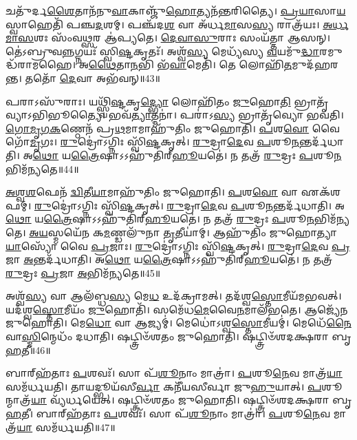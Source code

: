 𑌚𑌤𑍁᳴𑌰𑍍𑌦\-\ul{𑌶𑍈}\-𑌤𑌾𑌨᳴𑌨𑍁\-\ul{𑌵𑌾}\-𑌕𑌾𑌞𑍍𑌜𑍁᳴\-\ul{𑌹𑍋}\-𑌤𑍍𑌯𑌨᳴𑌨𑍍𑌤𑌰𑌿𑌤𑍍𑌯𑍈।
\-\ul{𑌪𑍍𑌰}\-\-\ul{𑌯𑌾}\-𑌸𑌾\-\ul{𑌯} 𑌸𑍍𑌵𑌾𑌹𑍇𑌤𑌿᳴ 𑌪𑌞𑍍𑌚\-\ul{𑌦}\-𑌶𑌮𑍍।
𑌪𑌞𑍍𑌚᳴𑌦\-\ul{𑌶} 𑌵𑌾 𑌅᳴𑌰𑍍𑌧\-\ul{𑌮𑌾}\-𑌸\-\ul{𑌸𑍍𑌯} 𑌰𑌾𑌤𑍍𑌰᳴𑌯𑌃।
\-\ul{𑌅}\-\-\ul{𑌰𑍍𑌧}\-\-\ul{𑌮𑌾}\-\-\ul{𑌸}\-𑌶𑌃 𑌸𑌂᳴𑌵\-\ul{𑌥𑍍𑌸}\-𑌰 𑌆॑𑌪𑍍𑌯𑌤𑍇।
\-\ul{𑌦𑍇}\-\-\ul{𑌵𑌾}\-\-\ul{𑌸𑍁}\-𑌰𑌾𑌃 𑌸𑌂𑌯᳴𑌤𑍍𑌤𑌾 𑌆𑌸𑌨𑍍।
𑌤𑍇॑𑌽𑌬𑍍𑌰𑍁𑌵\-\ul{𑌨𑍍𑌨}\-𑌗𑍍𑌨𑌯𑌃᳴ 𑌸𑍍𑌵𑌿\-\ul{𑌷𑍍𑌟}\-𑌕𑍃𑌤𑌃᳴।
𑌅𑌶𑍍𑌵᳴\-\ul{𑌸𑍍𑌯} 𑌮𑍇𑌧𑍍𑌯᳴𑌸𑍍𑌯 \ul{𑌵}\-𑌯𑌮𑍁᳴\-\ul{𑌦𑍍𑌧𑌾}\-𑌰𑌮𑍁𑌦𑍍𑌧᳴𑌰𑌾𑌮𑌹𑍈।
𑌅\-\ul{𑌥𑍈}\-𑌤𑌾\-\ul{𑌨}\-𑌭𑌿 𑌭᳴\-\ul{𑌵𑌾}\-𑌮𑍇𑌤𑌿᳴।
𑌤𑍇 𑌲𑍋𑌹𑌿᳴\-\ul{𑌤}\-𑌮𑍁𑌦᳴𑌹𑌰𑌨𑍍𑌤।
𑌤𑌤𑍋᳴ \ul{𑌦𑍇}\-𑌵𑌾 𑌅𑌭᳴𑌵𑌨𑍍॥43॥

𑌪𑌰𑌾𑌽𑌸𑍁᳴𑌰𑌾𑌃।
𑌯𑌥𑍍𑌸𑍍𑌵𑌿᳴\-\ul{𑌷𑍍𑌟}\-𑌕𑍃\-\ul{𑌦𑍍𑌭𑍍𑌯𑍋} 𑌲𑍋𑌹𑌿᳴𑌤𑌂 \ul{𑌜𑍁}\-𑌹𑍋\-\ul{𑌤𑌿} 𑌭𑍍𑌰𑌾𑌤𑍃᳴𑌵𑍍𑌯𑌾𑌽𑌭𑌿𑌭𑍂𑌤𑍍𑌯𑍈।
𑌭𑌵᳴\-\ul{𑌤𑍍𑌯𑌾}\-𑌤𑍍𑌮𑌨𑌾॑।
𑌪𑌰𑌾॑𑌽\-\ul{𑌸𑍍𑌯} 𑌭𑍍𑌰𑌾𑌤𑍃᳴𑌵𑍍𑌯𑍋 𑌭𑌵𑌤𑌿।
\-\ul{𑌗𑍋}\-\-\ul{𑌮𑍃}\-\-\ul{𑌗}\-\-\ul{𑌕}\-𑌣𑍍𑌠𑍇𑌨᳴ 𑌪𑍍𑌰\-\ul{𑌥}\-𑌮𑌾𑌮𑌾𑌹𑍁᳴𑌤𑌿𑌂 𑌜𑍁𑌹𑍋𑌤𑌿।
\-\ul{𑌪}\-𑌶\-\ul{𑌵𑍋} 𑌵𑍈 𑌗𑍋᳴\-\ul{𑌮𑍃}\-𑌗𑌃।
\-\ul{𑌰𑍁}\-𑌦𑍍𑌰𑍋॑\-𑌽𑌗𑍍𑌨𑌿𑌃 𑌸𑍍𑌵𑌿᳴\-\ul{𑌷𑍍𑌟}\-𑌕𑍃𑌤𑍍।
\-\ul{𑌰𑍁}\-𑌦𑍍𑌰𑌾\-\ul{𑌦𑍇}\-𑌵 \ul{𑌪}\-𑌶𑍂\-\ul{𑌨}\-𑌨𑍍𑌤𑌰𑍍𑌦᳴𑌧𑌾𑌤𑌿।
𑌅\-\ul{𑌥𑍋} 𑌯\-\ul{𑌤𑍍𑌰𑍈}\-𑌷𑌾\-𑌽𑌽𑌹𑍁᳴𑌤𑌿𑌰𑍍‌\mbox{}\-\ul{𑌹𑍂}\-𑌯𑌤𑍇॑।
𑌨 𑌤𑌤𑍍𑌰᳴ \ul{𑌰𑍁}\-𑌦𑍍𑌰𑌃 \ul{𑌪}\-𑌶𑍂\-\ul{𑌨}\-𑌭𑌿𑌮᳴𑌨𑍍𑌯𑌤𑍇॥44॥

\-\ul{𑌅}\-\-\ul{𑌶𑍍𑌵}\-\-\ul{𑌶}\-𑌫𑍇𑌨᳴ \ul{𑌦𑍍𑌵𑌿}\-𑌤𑍀\-\ul{𑌯𑌾}\-𑌮𑌾𑌹𑍁᳴𑌤𑌿𑌂 𑌜𑍁𑌹𑍋𑌤𑌿।
\-\ul{𑌪}\-𑌶\-\ul{𑌵𑍋} 𑌵𑌾 𑌏𑌕᳴𑌶𑌫𑌮𑍍।
\-\ul{𑌰𑍁}\-𑌦𑍍𑌰𑍋॑\-𑌽𑌗𑍍𑌨𑌿𑌃 𑌸𑍍𑌵𑌿᳴\-\ul{𑌷𑍍𑌟}\-𑌕𑍃𑌤𑍍।
\-\ul{𑌰𑍁}\-𑌦𑍍𑌰𑌾\-\ul{𑌦𑍇}\-𑌵 \ul{𑌪}\-𑌶𑍂\-\ul{𑌨}\-𑌨𑍍𑌤𑌰𑍍𑌦᳴𑌧𑌾𑌤𑌿।
𑌅\-\ul{𑌥𑍋} 𑌯\-\ul{𑌤𑍍𑌰𑍈}\-𑌷𑌾\-𑌽𑌽𑌹𑍁᳴𑌤𑌿𑌰𑍍‌\mbox{}\-\ul{𑌹𑍂}\-𑌯𑌤𑍇॑।
𑌨 𑌤𑌤𑍍𑌰᳴ \ul{𑌰𑍁}\-𑌦𑍍𑌰𑌃 \ul{𑌪}\-𑌶𑍂\-\ul{𑌨}\-𑌭𑌿𑌮᳴𑌨𑍍𑌯𑌤𑍇।
\-\ul{𑌅}\-\-\ul{𑌯}\-𑌸𑍍𑌮𑌯𑍇᳴𑌨 𑌕\-\ul{𑌮}\-𑌣𑍍𑌡𑌲𑍁᳴𑌨𑌾 \ul{𑌤𑍃}\-𑌤𑍀𑌯𑌾॑𑌮𑍍।
𑌆𑌹𑍁᳴𑌤𑌿𑌂 𑌜𑍁𑌹𑍋𑌤𑍍𑌯𑌾\-\ul{𑌯𑌾}\-𑌸𑍍𑌯𑍋᳴ 𑌵𑍈 \ul{𑌪𑍍𑌰}\-𑌜𑌾𑌃।
\-\ul{𑌰𑍁}\-𑌦𑍍𑌰𑍋॑\-𑌽𑌗𑍍𑌨𑌿𑌃 𑌸𑍍𑌵𑌿᳴\-\ul{𑌷𑍍𑌟}\-𑌕𑍃𑌤𑍍।
\-\ul{𑌰𑍁}\-𑌦𑍍𑌰𑌾\-\ul{𑌦𑍇}\-𑌵 \ul{𑌪𑍍𑌰}\-𑌜𑌾 \ul{𑌅}\-𑌨𑍍𑌤𑌰𑍍𑌦᳴𑌧𑌾𑌤𑌿।
𑌅\-\ul{𑌥𑍋} 𑌯\-\ul{𑌤𑍍𑌰𑍈}\-𑌷𑌾\-𑌽𑌽𑌹𑍁᳴𑌤𑌿𑌰𑍍‌\mbox{}\-\ul{𑌹𑍂}\-𑌯𑌤𑍇॑।
𑌨 𑌤𑌤𑍍𑌰᳴ \ul{𑌰𑍁}\-𑌦𑍍𑌰𑌃 \ul{𑌪𑍍𑌰}\-𑌜𑌾 \ul{𑌅}\-𑌭𑌿𑌮᳴𑌨𑍍𑌯𑌤𑍇॥45॥\anuvakamend[\-\ul{𑌦}\-\-\ul{𑌧𑌾}\-𑌤𑍍𑌯𑌭᳴𑌵𑌨𑍍𑌮𑌨𑍍𑌯𑌤𑍇 \ul{𑌪𑍍𑌰}\-𑌜𑌾 \ul{𑌅}\-𑌨𑍍𑌤𑌰𑍍𑌦᳴𑌧𑌾\-\ul{𑌤𑌿} 𑌦𑍍𑌵𑍇 𑌚᳴ ]

𑌅𑌶𑍍𑌵᳴\-\ul{𑌸𑍍𑌯} 𑌵𑌾 𑌆𑌲᳴𑌬𑍍𑌧\-\ul{𑌸𑍍𑌯} 𑌮𑍇\-\ul{𑌧} 𑌉𑌦᳴𑌕𑍍𑌰𑌾𑌮𑌤𑍍।
𑌤𑌦᳴𑌶𑍍𑌵\-\ul{𑌸𑍍𑌤𑍋}\-𑌮𑍀𑌯᳴\-𑌮𑌭𑌵𑌤𑍍।
𑌯𑌦᳴𑌶𑍍𑌵\-\ul{𑌸𑍍𑌤𑍋}\-𑌮𑍀𑌯𑌂᳴ \ul{𑌜𑍁}\-𑌹𑍋𑌤𑌿᳴।
𑌸𑌮𑍇᳴𑌧\-\ul{𑌮𑍇}\-𑌵𑍈\-\ul{𑌨}\-𑌮𑌾𑌲᳴𑌭𑌤𑍇।
𑌆𑌜𑍍𑌯𑍇᳴𑌨 𑌜𑍁𑌹𑍋𑌤𑌿।
𑌮𑍇\-\ul{𑌧𑍋} 𑌵𑌾 𑌆𑌜𑍍𑌯𑌮𑍍॑।
𑌮𑍇𑌧𑍋॑\-𑌽𑌶𑍍𑌵\-\ul{𑌸𑍍𑌤𑍋}\-𑌮𑍀𑌯𑌮𑍍॑।
𑌮𑍇𑌧𑍇᳴\-\ul{𑌨𑍈}\-𑌵𑌾\-\ul{𑌸𑍍𑌮𑌿}\-𑌨𑍍𑌮𑍇𑌧𑌂᳴ 𑌦𑌧𑌾𑌤𑌿।
𑌷𑌟𑍍𑌤𑍍𑌰𑌿𑍞᳴𑌶𑌤𑌂 𑌜𑍁𑌹𑍋𑌤𑌿।
𑌷𑌟𑍍𑌤𑍍𑌰𑌿𑍞᳴𑌶𑌦𑌕𑍍𑌷𑌰𑌾 𑌬𑍃\-\ul{𑌹}\-𑌤𑍀॥46॥

𑌬𑌾𑌰𑍍‌\mbox{}𑌹᳴𑌤𑌾𑌃 \ul{𑌪}\-𑌶𑌵𑌃᳴।
𑌸𑌾 𑌪᳴\-\ul{𑌶𑍂}\-𑌨𑌾𑌂 𑌮𑌾𑌤𑍍𑌰𑌾॑।
\-\ul{𑌪}\-𑌶𑍂\-\ul{𑌨𑍇}\-𑌵 𑌮𑌾𑌤𑍍𑌰᳴\-\ul{𑌯𑌾} 𑌸𑌮᳴𑌰𑍍𑌧𑌯𑌤𑌿।
𑌤𑌾𑌯𑌦𑍍𑌭𑍂𑌯᳴𑌸𑍀\-\ul{𑌰𑍍𑌵𑌾} 𑌕𑌨𑍀᳴𑌯𑌸𑍀𑌰𑍍𑌵𑌾 𑌜𑍁\-\ul{𑌹𑍁}\-𑌯𑌾𑌤𑍍।
\-\ul{𑌪}\-𑌶𑍂𑌨𑍍𑌮𑌾𑌤𑍍𑌰᳴\-\ul{𑌯𑌾} 𑌵𑍍𑌯᳴𑌰𑍍𑌧𑌯𑍇𑌤𑍍।
𑌷𑌟𑍍𑌤𑍍𑌰𑌿𑍞᳴𑌶𑌤𑌂 𑌜𑍁𑌹𑍋𑌤𑌿।
𑌷𑌟𑍍𑌤𑍍𑌰𑌿𑍞᳴𑌶𑌦𑌕𑍍𑌷𑌰𑌾 𑌬𑍃\-\ul{𑌹}\-𑌤𑍀।
𑌬𑌾𑌰𑍍‌\mbox{}𑌹᳴𑌤𑌾𑌃 \ul{𑌪}\-𑌶𑌵𑌃᳴।
𑌸𑌾 𑌪᳴\-\ul{𑌶𑍂}\-𑌨𑌾𑌂 𑌮𑌾𑌤𑍍𑌰𑌾॑।
\-\ul{𑌪}\-𑌶𑍂\-\ul{𑌨𑍇}\-𑌵 𑌮𑌾𑌤𑍍𑌰᳴\-\ul{𑌯𑌾} 𑌸𑌮᳴𑌰𑍍𑌧𑌯𑌤𑌿॥47॥

